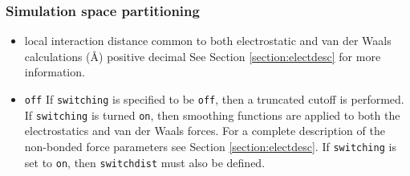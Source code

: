 \subsubsection{Simulation space partitioning}

\begin{itemize}


\item
{}
{local interaction distance common to both electrostatic 
and van der Waals calculations (\AA)}
{positive decimal}
{%
See Section \ref{section:electdesc} for more information.}

\item
{}
{\verb!off!}
{If \verb!switching! is
specified to be \verb!off!, then a truncated cutoff is performed.
If \verb!switching! is turned \verb!on!, then smoothing functions
are applied to both the electrostatics and van der Waals forces.
For a complete description of the non-bonded force parameters see
Section \ref{section:electdesc}.  If \verb!switching! is set to
\verb!on!, then \verb!switchdist! must also be defined.}


\end{itemize}
